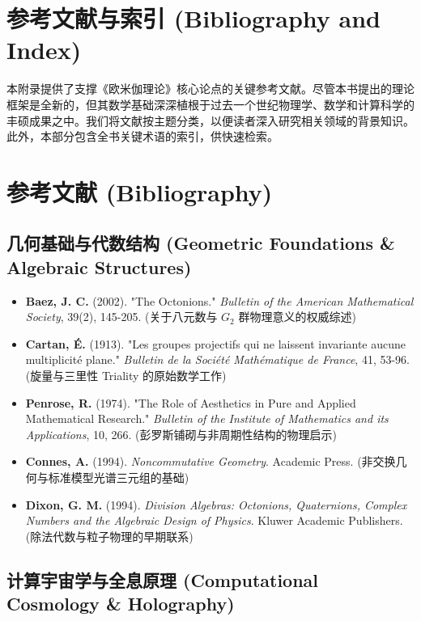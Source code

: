 \section{参考文献与索引 (Bibliography and Index)}

本附录提供了支撑《欧米伽理论》核心论点的关键参考文献。尽管本书提出的理论框架是全新的，但其数学基础深深植根于过去一个世纪物理学、数学和计算科学的丰硕成果之中。我们将文献按主题分类，以便读者深入研究相关领域的背景知识。此外，本部分包含全书关键术语的索引，供快速检索。

\section{参考文献 (Bibliography)}

\subsection{几何基础与代数结构 (Geometric Foundations \& Algebraic Structures)}

\begin{itemize}
\item \textbf{Baez, J. C.} (2002). "The Octonions." \textit{Bulletin of the American Mathematical Society}, 39(2), 145-205. (关于八元数与 $G_2$ 群物理意义的权威综述)
\item \textbf{Cartan, É.} (1913). "Les groupes projectifs qui ne laissent invariante aucune multiplicité plane." \textit{Bulletin de la Société Mathématique de France}, 41, 53-96. (旋量与三里性 Triality 的原始数学工作)
\item \textbf{Penrose, R.} (1974). "The Role of Aesthetics in Pure and Applied Mathematical Research." \textit{Bulletin of the Institute of Mathematics and its Applications}, 10, 266. (彭罗斯铺砌与非周期性结构的物理启示)
\item \textbf{Connes, A.} (1994). \textit{Noncommutative Geometry}. Academic Press. (非交换几何与标准模型光谱三元组的基础)
\item \textbf{Dixon, G. M.} (1994). \textit{Division Algebras: Octonions, Quaternions, Complex Numbers and the Algebraic Design of Physics}. Kluwer Academic Publishers. (除法代数与粒子物理的早期联系)
\end{itemize}

\subsection{计算宇宙学与全息原理 (Computational Cosmology \& Holography)}

